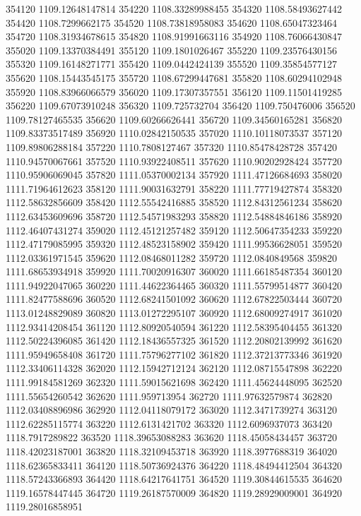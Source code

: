 {354120 1109.12648147814
354220 1108.33289988455
354320 1108.58493627442
354420 1108.7299662175
354520 1108.73818958083
354620 1108.65047323464
354720 1108.31934678615
354820 1108.91991663116
354920 1108.76066430847
355020 1109.13370384491
355120 1109.1801026467
355220 1109.23576430156
355320 1109.16148271771
355420 1109.0442424139
355520 1109.35854577127
355620 1108.15443545175
355720 1108.67299447681
355820 1108.60294102948
355920 1108.83966066579
356020 1109.17307357551
356120 1109.11501419285
356220 1109.67073910248
356320 1109.725732704
356420 1109.750476006
356520 1109.78127465535
356620 1109.60266626441
356720 1109.34560165281
356820 1109.83373517489
356920 1110.02842150535
357020 1110.10118073537
357120 1109.89806288184
357220 1110.7808127467
357320 1110.85478428728
357420 1110.94570067661
357520 1110.93922408511
357620 1110.90202928424
357720 1110.95906069045
357820 1111.05370002134
357920 1111.47126684693
358020 1111.71964612623
358120 1111.90031632791
358220 1111.77719427874
358320 1112.58632856609
358420 1112.55542416885
358520 1112.84312561234
358620 1112.63453609696
358720 1112.54571983293
358820 1112.54884846186
358920 1112.46407431274
359020 1112.45121257482
359120 1112.50647354233
359220 1112.47179085995
359320 1112.48523158902
359420 1111.99536628051
359520 1112.03361971545
359620 1112.08468011282
359720 1112.0840849568
359820 1111.68653934918
359920 1111.70020916307
360020 1111.66185487354
360120 1111.94922047065
360220 1111.44622364465
360320 1111.55799514877
360420 1111.82477588696
360520 1112.68241501092
360620 1112.67822503444
360720 1113.01248829089
360820 1113.01272295107
360920 1112.68009274917
361020 1112.93414208454
361120 1112.80920540594
361220 1112.58395404455
361320 1112.50224396085
361420 1112.18436557325
361520 1112.20802139992
361620 1111.95949658408
361720 1111.75796277102
361820 1112.37213773346
361920 1112.33406114328
362020 1112.15942712124
362120 1112.08715547898
362220 1111.99184581269
362320 1111.59015621698
362420 1111.45624448095
362520 1111.55654260542
362620 1111.959713954
362720 1111.97632579874
362820 1112.03408896986
362920 1112.04118079172
363020 1112.3471739274
363120 1112.62285115774
363220 1112.6131421702
363320 1112.6096937073
363420 1118.7917289822
363520 1118.39653088283
363620 1118.45058434457
363720 1118.42023187001
363820 1118.32109453718
363920 1118.3977688319
364020 1118.62365833411
364120 1118.50736924376
364220 1118.48494412504
364320 1118.57243366893
364420 1118.64217641751
364520 1119.30844615535
364620 1119.16578447445
364720 1119.26187570009
364820 1119.28929009001
364920 1119.28016858951
}
